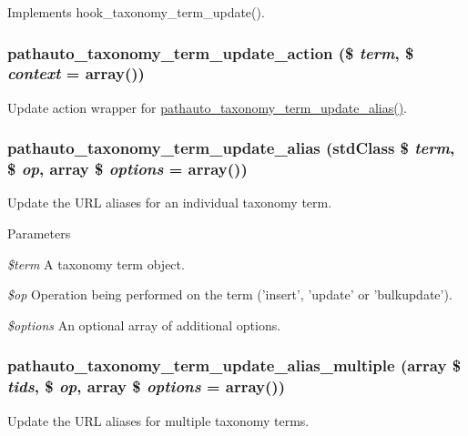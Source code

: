 \label{pathauto_8module_ab861a0bd8ac0d1116d50dc5e446e510b}
Implements hook\_\-taxonomy\_\-term\_\-update(). \hypertarget{pathauto_8module_a5d96ab0723a69f47adf684f49244a47b}{
\subsubsection[{pathauto\_\-taxonomy\_\-term\_\-update\_\-action}]{\setlength{\rightskip}{0pt plus 5cm}pathauto\_\-taxonomy\_\-term\_\-update\_\-action (\$ {\em term}, \/  \$ {\em context} = {\ttfamily array()})}}
\label{pathauto_8module_a5d96ab0723a69f47adf684f49244a47b}
Update action wrapper for \hyperlink{pathauto_8module_a80bfb73e9db12fd22e6cd9908a9bca26}{pathauto\_\-taxonomy\_\-term\_\-update\_\-alias()}. \hypertarget{pathauto_8module_a80bfb73e9db12fd22e6cd9908a9bca26}{
\subsubsection[{pathauto\_\-taxonomy\_\-term\_\-update\_\-alias}]{\setlength{\rightskip}{0pt plus 5cm}pathauto\_\-taxonomy\_\-term\_\-update\_\-alias (stdClass \$ {\em term}, \/  \$ {\em op}, \/  array \$ {\em options} = {\ttfamily array()})}}
\label{pathauto_8module_a80bfb73e9db12fd22e6cd9908a9bca26}
Update the URL aliases for an individual taxonomy term.


\begin{DoxyParams}{Parameters}
\item[{\em \$term}]A taxonomy term object. \item[{\em \$op}]Operation being performed on the term ('insert', 'update' or 'bulkupdate'). \item[{\em \$options}]An optional array of additional options. \end{DoxyParams}
\hypertarget{pathauto_8module_aeeb7b2b0dc21146863ea234e0fb9b427}{
\subsubsection[{pathauto\_\-taxonomy\_\-term\_\-update\_\-alias\_\-multiple}]{\setlength{\rightskip}{0pt plus 5cm}pathauto\_\-taxonomy\_\-term\_\-update\_\-alias\_\-multiple (array \$ {\em tids}, \/  \$ {\em op}, \/  array \$ {\em options} = {\ttfamily array()})}}
\label{pathauto_8module_aeeb7b2b0dc21146863ea234e0fb9b427}
Update the URL aliases for multiple taxonomy terms.



